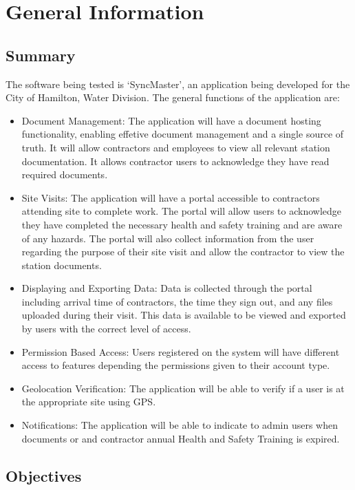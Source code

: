 \documentclass[12pt, titlepage]{article}
\begin{document}
\section{General Information}

\subsection{Summary}

The software being tested is `SyncMaster', an application being
developed for the City of Hamilton, Water Division. The general
functions of the application are:

\begin{itemize}
  \item Document Management: The application will have a document
    hosting functionality, enabling effetive document management and
    a single source of truth.
    It will allow contractors and employees to view all relevant
    station documentation.
    It allows contractor users to acknowledge they have read required documents.
  \item Site Visits: The application will have a portal
    accessible to contractors attending site to complete work. The
    portal will allow users to acknowledge they have
    completed the necessary health and safety training and are aware
    of any hazards. The portal will also collect
    information from the user regarding the purpose of their site
    visit and allow the contractor to view
    the station documents.
  \item Displaying and Exporting Data: Data is collected through the
    portal including arrival time of contractors, the time they sign out,
    and any files uploaded during their visit. This data is
    available to be viewed and exported by users with the correct
    level of access.
  \item Permission Based Access: Users registered on the system will
    have different access to features depending the permissions given
    to their account type.
  \item Geolocation Verification: The application will be able to
    verify if a user is at the appropriate site using GPS.
  \item Notifications: The application will be able to indicate to admin users
    when documents or and contractor annual Health and Safety
    Training is expired.
\end{itemize}

\subsection{Objectives}
\end{document}
